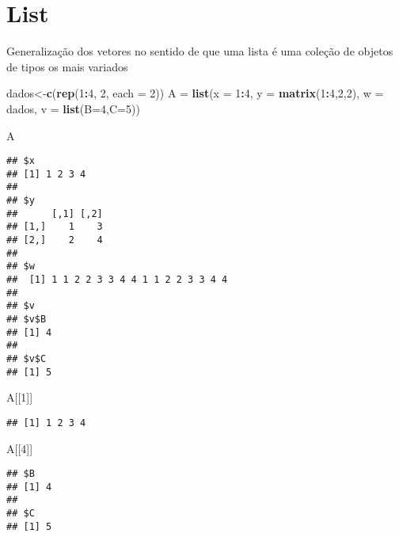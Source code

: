 \documentclass[]{article}
\newenvironment{Shaded}{\begin{snugshade}}{\end{snugshade}}
\newcommand{\KeywordTok}[1]{\textcolor[rgb]{0.13,0.29,0.53}{\textbf{#1}}}
\newcommand{\DataTypeTok}[1]{\textcolor[rgb]{0.13,0.29,0.53}{#1}}
\newcommand{\DecValTok}[1]{\textcolor[rgb]{0.00,0.00,0.81}{#1}}
\newcommand{\StringTok}[1]{\textcolor[rgb]{0.31,0.60,0.02}{#1}}
\newcommand{\OperatorTok}[1]{\textcolor[rgb]{0.81,0.36,0.00}{\textbf{#1}}}
\newcommand{\NormalTok}[1]{#1}
\begin{document}
\section{List}\label{list}

Generalização dos vetores no sentido de que uma lista é uma coleção de
objetos de tipos os mais variados

\begin{Shaded}
\begin{Highlighting}[]
\NormalTok{dados<-}\KeywordTok{c}\NormalTok{(}\KeywordTok{rep}\NormalTok{(}\DecValTok{1}\OperatorTok{:}\DecValTok{4}\NormalTok{, }\DecValTok{2}\NormalTok{, }\DataTypeTok{each =} \DecValTok{2}\NormalTok{))}
\NormalTok{A =}\StringTok{ }\KeywordTok{list}\NormalTok{(}\DataTypeTok{x =} \DecValTok{1}\OperatorTok{:}\DecValTok{4}\NormalTok{, }\DataTypeTok{y =} \KeywordTok{matrix}\NormalTok{(}\DecValTok{1}\OperatorTok{:}\DecValTok{4}\NormalTok{,}\DecValTok{2}\NormalTok{,}\DecValTok{2}\NormalTok{), }\DataTypeTok{w =}\NormalTok{ dados, }\DataTypeTok{v =} \KeywordTok{list}\NormalTok{(}\DataTypeTok{B=}\DecValTok{4}\NormalTok{,}\DataTypeTok{C=}\DecValTok{5}\NormalTok{))}

\NormalTok{A}
\end{Highlighting}
\end{Shaded}

\begin{verbatim}
## $x
## [1] 1 2 3 4
## 
## $y
##      [,1] [,2]
## [1,]    1    3
## [2,]    2    4
## 
## $w
##  [1] 1 1 2 2 3 3 4 4 1 1 2 2 3 3 4 4
## 
## $v
## $v$B
## [1] 4
## 
## $v$C
## [1] 5
\end{verbatim}

\begin{Shaded}
\begin{Highlighting}[]
\NormalTok{A[[}\DecValTok{1}\NormalTok{]]}
\end{Highlighting}
\end{Shaded}

\begin{verbatim}
## [1] 1 2 3 4
\end{verbatim}

\begin{Shaded}
\begin{Highlighting}[]
\NormalTok{A[[}\DecValTok{4}\NormalTok{]]}
\end{Highlighting}
\end{Shaded}

\begin{verbatim}
## $B
## [1] 4
## 
## $C
## [1] 5
\end{verbatim}
\end{document}
